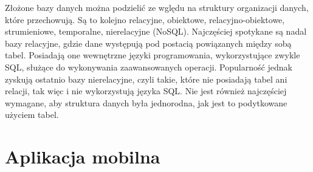 Złożone bazy danych można podzielić ze wględu na struktury organizacji danych, które przechowują. Są to kolejno relacyjne, obiektowe, relacyjno-obiektowe, strumieniowe, temporalne, nierelacyjne (NoSQL). \linebreak
Najczęściej spotykane są nadal bazy relacyjne, gdzie dane występują pod postacią powiązanych między sobą tabel. Posiadają one wewnętrzne języki programowania, wykorzystujące zwykle SQL, służące do wykonywania zaawansowanych operacji. Popularność jednak zyskują ostatnio bazy nierelacyjne, czyli takie, które nie posiadają tabel ani relacji, tak więc i nie wykorzystują języka SQL. Nie jest również najczęściej wymagane, aby struktura danych była jednorodna, jak jest to podytkowane użyciem tabel. 

\section{Aplikacja mobilna}